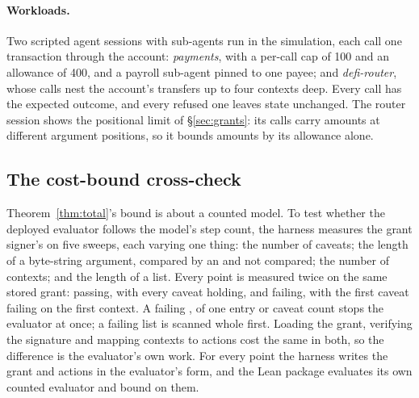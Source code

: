 \paragraph{Workloads.} Two scripted agent sessions with sub-agents run in the
simulation, each call one transaction through the account: \emph{payments},
with a per-call cap of 100 and an allowance of 400, and a payroll sub-agent
pinned to one payee; and \emph{defi-router}, whose calls nest the account's
transfers up to four contexts deep. Every call has the expected outcome, and
every refused one leaves state unchanged. The router session shows the
positional limit of \S\ref{sec:grants}: its calls carry amounts at different
argument positions, so it bounds amounts by its allowance alone.

\subsection{The cost-bound cross-check}

Theorem~\ref{thm:total}'s bound is about a counted model. To test whether the
deployed evaluator follows the model's step count, the harness measures the
grant signer's  on five sweeps, each varying one thing:
the number of caveats; the length of a byte-string argument, compared by an
 and not compared; the number of contexts; and the length of a
 list. Every point is measured twice on the same stored
grant: passing, with every caveat holding, and failing, with the first caveat
failing on the first context. A failing ,  of
one entry or caveat count stops the evaluator at once; a failing
 list is scanned whole first. Loading the
grant, verifying the signature and mapping contexts to actions cost the same
in both, so the difference is the evaluator's own work. For every point the
harness writes the grant and actions in the evaluator's form, and the Lean
package evaluates its own counted evaluator and bound on them.


